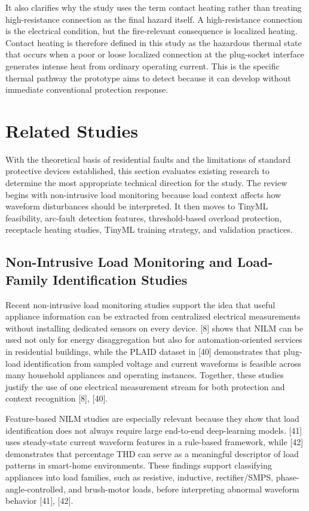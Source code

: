 It also clarifies why the study uses the term contact heating rather
than treating high-resistance connection as the final hazard itself. A
high-resistance connection is the electrical condition, but the
fire-relevant consequence is localized heating. Contact heating is
therefore defined in this study as the hazardous thermal state that
occurs when a poor or loose localized connection at the plug-socket
interface generates intense heat from ordinary operating current. This
is the specific thermal pathway the prototype aims to detect because it
can develop without immediate conventional protection response.

\section{Related Studies}\label{sec:related-studies}

With the theoretical basis of residential faults and the limitations of
standard protective devices established, this section evaluates existing
research to determine the most appropriate technical direction for the
study. The review begins with non-intrusive load monitoring because load
context affects how waveform disturbances should be interpreted. It then
moves to TinyML feasibility, arc-fault detection features,
threshold-based overload protection, receptacle heating studies, TinyML
training strategy, and validation practices.

\subsection{Non-Intrusive Load Monitoring and Load-Family Identification Studies}\label{non-intrusive-load-monitoring-and-load-family-identification-studies}

Recent non-intrusive load monitoring studies support the idea that
useful appliance information can be extracted from centralized
electrical measurements without installing dedicated sensors on every
device. {[}8{]} shows that NILM can be used not only for energy
disaggregation but also for automation-oriented services in residential
buildings, while the PLAID dataset in {[}40{]} demonstrates that
plug-load identification from sampled voltage and current waveforms is
feasible across many household appliances and operating instances.
Together, these studies justify the use of one electrical measurement
stream for both protection and context recognition {[}8{]}, {[}40{]}.

Feature-based NILM studies are especially relevant because they show
that load identification does not always require large end-to-end
deep-learning models. {[}41{]} uses steady-state current waveform
features in a rule-based framework, while {[}42{]} demonstrates that
percentage THD can serve as a meaningful descriptor of load patterns in
smart-home environments. These findings support classifying appliances
into load families, such as resistive, inductive, rectifier/SMPS,
phase-angle-controlled, and brush-motor loads, before interpreting
abnormal waveform behavior {[}41{]}, {[}42{]}.

